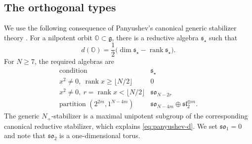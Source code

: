\documentclass[11pt]{amsart}
\theoremstyle{definition}
\theoremstyle{remark}
\newcommand{\g}{\mathfrak g}
\newcommand{\slalg}{\mathfrak{sl}}
\newcommand{\soalg}{\mathfrak{so}}
\DeclareMathOperator{\rank}{rank}
\begin{document}
\subsection{The orthogonal types}
We use the following consequence of Panyushev's canonical generic
stabilizer theory \cite[Section~2.1 and Theorem~5.3]{Pan}. For a
nilpotent orbit $\mathbb O\subset\g$, there is a reductive
algebra $\mathfrak s_\star$ such that
\begin{equation}\label{eq:panyushev-d}
 d(\mathbb O)=\frac12\bigl(\dim\mathfrak s_\star
                              -\rank\mathfrak s_\star\bigr).
\end{equation}
For $N\ge7$, the required algebras are
\begin{equation}\label{eq:panyushev-table}
\begin{array}{c|c}
\text{condition}&\mathfrak s_\star\\\hline
x^2\ne0,\ \rank x\ge\lfloor N/2\rfloor&0\\
x^2\ne0,\ r=\rank x<\lfloor N/2\rfloor&\soalg_{N-2r}\\
\text{partition }(2^{2m},1^{N-4m})
 &\soalg_{N-4m}\oplus\slalg_2^{\oplus m}.
\end{array}
\end{equation}
The generic $N_+$-stabilizer is a maximal unipotent subgroup of the
corresponding canonical reductive stabilizer, which explains
\eqref{eq:panyushev-d}. We set $\soalg_1=0$ and note that
$\soalg_2$ is a one-dimensional torus.
\end{document}
